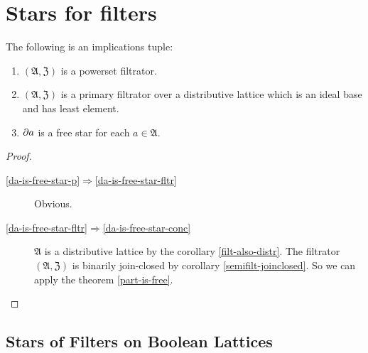 \section{Stars for filters}
\begin{thm}
\label{da-is-free-star}The following is an implications tuple:
\begin{enumerate}
\item \label{da-is-free-star-p}$(\mathfrak{A},\mathfrak{Z})$ is a powerset
filtrator.
\item \label{da-is-free-star-fltr}$(\mathfrak{A},\mathfrak{Z})$ is a primary
filtrator over a distributive lattice which is an ideal
base and has least element.
\item \label{da-is-free-star-conc}$\partial a$ is a free star for each
$a\in\mathfrak{A}$.
\end{enumerate}
\end{thm}
\begin{proof}
~
\begin{description}
\item [{\ref{da-is-free-star-p}$\Rightarrow$\ref{da-is-free-star-fltr}}] Obvious.
\item [{\ref{da-is-free-star-fltr}$\Rightarrow$\ref{da-is-free-star-conc}}] $\mathfrak{A}$
is a distributive lattice by the corollary \ref{filt-also-distr}.
The filtrator $(\mathfrak{A},\mathfrak{Z})$ is binarily join-closed
by corollary \ref{semifilt-joinclosed}. So we can apply the theorem
\ref{part-is-free}.
\end{description}
\end{proof}

\subsection{Stars of Filters on Boolean Lattices}

